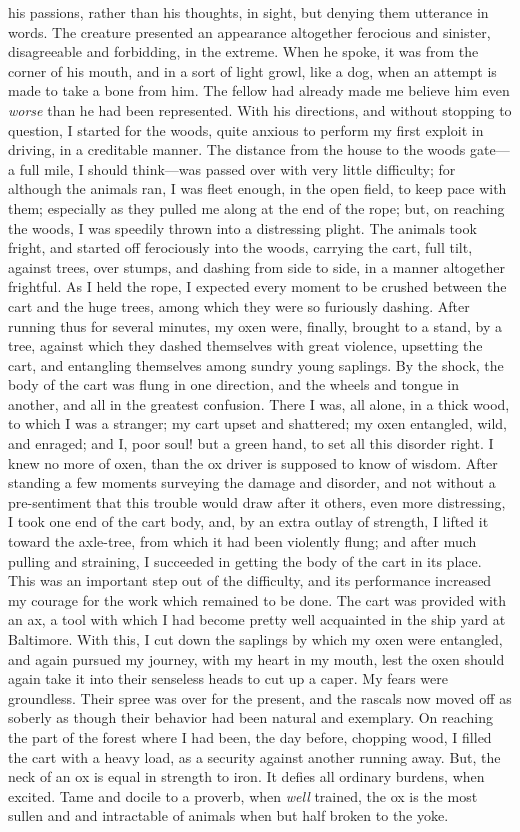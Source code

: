 his passions, rather than his thoughts, in sight, but denying them
utterance in words. The creature presented an appearance altogether
ferocious and sinister, disagreeable and forbidding, in the extreme.
When he spoke, it was from the corner of his mouth, and in a sort of
light growl, like a dog, when an attempt is made to take a bone from
him. The fellow had already made me believe him even \emph{worse} than
he had been represented. With his directions, and without stopping to
question, I started for the woods, quite anxious to perform my first
exploit in driving, in a creditable manner. The distance from the house
to the woods gate---a full mile, I should think---was passed over with
very little difficulty; for although the animals ran, I was fleet
enough, in the open field, to keep pace with them; especially as they
pulled me along at the end of the {}rope; but, on reaching the woods, I
was speedily thrown into a distressing plight. The animals took fright,
and started off ferociously into the woods, carrying the cart, full
tilt, against trees, over stumps, and dashing from side to side, in a
manner altogether frightful. As I held the rope, I expected every moment
to be crushed between the cart and the huge trees, among which they were
so furiously dashing. After running thus for several minutes, my oxen
were, finally, brought to a stand, by a tree, against which they dashed
themselves with great violence, upsetting the cart, and entangling
themselves among sundry young saplings. By the shock, the body of the
cart was flung in one direction, and the wheels and tongue in another,
and all in the greatest confusion. There I was, all alone, in a thick
wood, to which I was a stranger; my cart upset and shattered; my oxen
entangled, wild, and enraged; and I, poor soul! but a green hand, to set
all this disorder right. I knew no more of oxen, than the ox driver is
supposed to know of wisdom. After standing a few moments surveying the
damage and disorder, and not without a pre-sentiment that this trouble
would draw after it others, even more distressing, I took one end of the
cart body, and, by an extra outlay of strength, I lifted it toward the
axle-tree, from which it had been violently flung; and after much
pulling and straining, I succeeded in getting the body of the cart in
its place. This was an important step out of the difficulty, and its
performance increased my courage for the work which remained to be done.
The cart was provided with an ax, a tool with which I had become pretty
{}well acquainted in the ship yard at Baltimore. With this, I cut down
the saplings by which my oxen were entangled, and again pursued my
journey, with my heart in my mouth, lest the oxen should again take it
into their senseless heads to cut up a caper. My fears were groundless.
Their spree was over for the present, and the rascals now moved off as
soberly as though their behavior had been natural and exemplary. On
reaching the part of the forest where I had been, the day before,
chopping wood, I filled the cart with a heavy load, as a security
against another running away. But, the neck of an ox is equal in
strength to iron. It defies all ordinary burdens, when excited. Tame and
docile to a proverb, when \emph{well} trained, the ox is the most sullen
and and intractable of animals when but half broken to the yoke.

